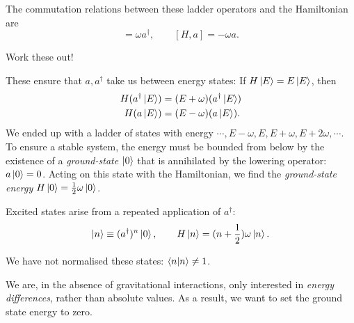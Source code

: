 The commutation relations between these ladder operators and the Hamiltonian are
\begin{equation}
  [H, a^\dagger] = \omega a^\dagger, \qquad [H, a] = -\omega a.
\end{equation} 
\begin{exercise}
Work these out!
\end{exercise}
These ensure that $a, a^\dagger$ take us between energy states:
If $H \ket{E} = E \ket{E}$, then
\begin{align}
  H(a^\dagger \ket{E}) &= (E + \omega) (a^\dagger \ket{E}) \\
  H(a \ket{ E}) &=(E - \omega) (a \ket{E}).
\end{align}
We ended up with a ladder of states with energy $\cdots, E-\omega, E, E + \omega, E + 2 \omega, \cdots$.
To ensure a stable system, the energy must be bounded from below by the existence of a \emph{ground-state} $\ket{0}$ that is annihilated by the lowering operator: $a \ket{0} = 0$.
Acting on this state with the Hamiltonian, we find the \emph{ground-state energy} $H \ket{0} = \frac{1}{2} \omega \ket{0}$.

Excited states arise from a repeated application of $a^\dagger$:
 \begin{equation}
   \ket{n} \equiv (a^\dagger)^n \ket{0}, \qquad H \ket{n} = (n + \frac{1}{2}) \omega \ket{n}.
\end{equation}
\begin{leftbar}
  \begin{remark}
    We have not normalised these states: $\bra{n} \ket{n} \neq 1$.
  \end{remark}
\end{leftbar}
\begin{leftbar}
  \begin{remark}
    We are, in the absence of gravitational interactions, only interested in \emph{energy differences}, rather than absolute values. As a result, we want to set the ground state energy to zero.
  \end{remark}
\end{leftbar}

